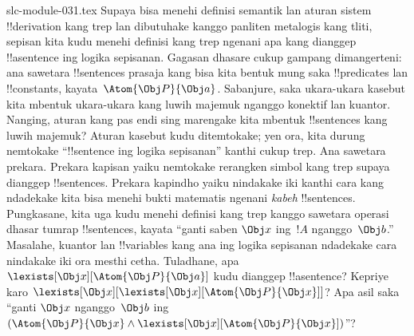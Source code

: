 \begin{filecontents*}[overwrite]{slc-module-031.tex}
Supaya bisa menehi definisi semantik lan aturan sistem !!{derivation}
kang trep lan dibutuhake kanggo panliten metalogis kang tliti, sepisan
kita kudu menehi definisi kang trep ngenani apa kang dianggep
!!a{sentence} ing logika sepisanan. Gagasan dhasare cukup gampang
dimangerteni: ana sawetara !!{sentence}s prasaja kang bisa kita bentuk
mung saka !!{predicate}s lan !!{constant}s, kayata~$\Atom{\Obj P}{\Obj
a}$. Sabanjure, saka ukara-ukara kasebut kita mbentuk ukara-ukara kang
luwih majemuk nganggo konektif lan kuantor. Nanging, aturan kang
pas endi sing marengake kita mbentuk !!{sentence}s kang luwih majemuk?
Aturan kasebut kudu ditemtokake; yen ora, kita durung nemtokake
``!!{sentence} ing logika sepisanan'' kanthi cukup trep. Ana sawetara
prekara. Prekara kapisan yaiku nemtokake rerangken simbol kang trep
supaya dianggep !!{sentence}s. Prekara kapindho yaiku nindakake iki
kanthi cara kang ndadekake kita bisa menehi bukti matematis ngenani
\emph{kabeh} !!{sentence}s. Pungkasane, kita uga kudu menehi definisi
kang trep kanggo sawetara operasi dhasar tumrap !!{sentence}s, kayata
``ganti saben $\Obj x$ ing~$!A$ nganggo~$\Obj b$.'' Masalahe, kuantor
lan !!{variable}s kang ana ing logika sepisanan ndadekake cara
nindakake iki ora mesthi cetha. Tuladhane, apa $\lexists[\Obj
x][\Atom{\Obj P}{\Obj a}]$ kudu dianggep !!a{sentence}? Kepriye karo
$\lexists[\Obj x][\lexists[\Obj x][\Atom{\Obj P}{\Obj x}]]$? Apa asil
saka ``ganti $\Obj x$ nganggo~$\Obj b$ ing $(\Atom{\Obj
P}{\Obj x} \land \lexists[\Obj x][\Atom{\Obj P}{\Obj x}])$''?


\end{filecontents*}


